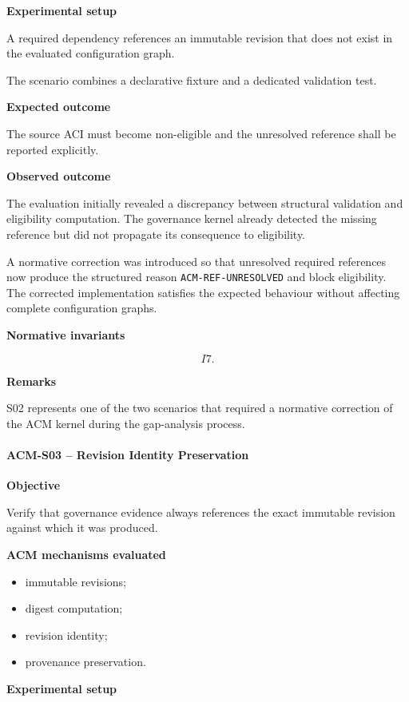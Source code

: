 \documentclass[10pt]{article}
\begin{document}
\textbf{Experimental setup}

A required dependency references an immutable revision that does not exist in
the evaluated configuration graph.

The scenario combines a declarative fixture and a dedicated validation test.

\textbf{Expected outcome}

The source ACI must become non-eligible and the unresolved reference shall be
reported explicitly.

\textbf{Observed outcome}

The evaluation initially revealed a discrepancy between structural validation
and eligibility computation. The governance kernel already detected the missing
reference but did not propagate its consequence to eligibility.

A normative correction was introduced so that unresolved required references
now produce the structured reason
\texttt{ACM-REF-UNRESOLVED} and block eligibility.
The corrected implementation satisfies the expected behaviour without affecting
complete configuration graphs.

\textbf{Normative invariants}

\[
I7.
\]

\textbf{Remarks}

S02 represents one of the two scenarios that required a normative correction of
the ACM kernel during the gap-analysis process.

\paragraph{ACM-S03 -- Revision Identity Preservation}

\textbf{Objective}

Verify that governance evidence always references the exact immutable revision
against which it was produced.

\textbf{ACM mechanisms evaluated}

\begin{itemize}
\item immutable revisions;
\item digest computation;
\item revision identity;
\item provenance preservation.
\end{itemize}

\textbf{Experimental setup}
\end{document}
